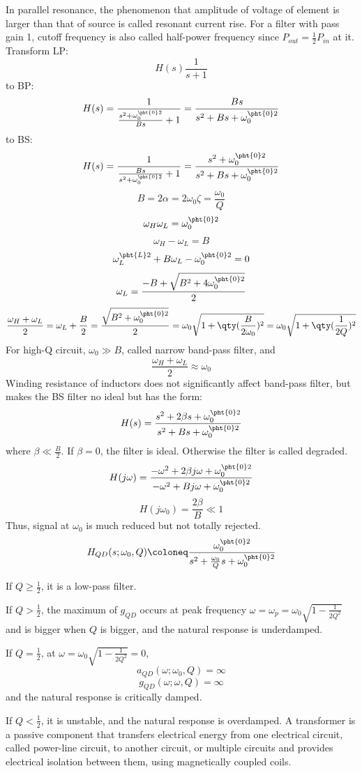 \documentclass[a4paper,12pt]{article}
\begin{document}
In parallel resonance, the phenomenon that amplitude of voltage of element is larger than that of source is called resonant current rise.
For a filter with pass gain 1, cutoff frequency is also called half-power frequency since $P_{out}=\frac{1}{2}P_{in}$ at it.
Transform LP:
\[H(s)\frac{1}{s+1}\]
to BP:
\[H(s)=\frac{1}{\frac{s^2+\omega_0^{\pht{0}2}}{Bs}+1}=\frac{Bs}{s^2+Bs+\omega_0^{\pht{0}2}}\]
to BS:
\[H(s)=\frac{1}{\frac{Bs}{s^2+\omega_0^{\pht{0}2}}+1}=\frac{s^2+\omega_0^{\pht{0}2}}{s^2+Bs+\omega_0^{\pht{0}2}}\]
\[B=2\alpha=2\omega_0\zeta=\frac{\omega_0}{Q}\]
\[\omega_H\omega_L=\omega_0^{\pht{0}2}\]
\[\omega_H-\omega_L=B\]
\[\omega_L^{\pht{L}2}+B\omega_L-\omega_0^{\pht{0}2}=0\]
\[\omega_L=\frac{-B+\sqrt{B^2+4\omega_0^{\pht{0}2}}}{2}\]
\[\frac{\omega_H+\omega_L}{2}=\omega_L+\frac{B}{2}=\frac{\sqrt{B^2+\omega_0^{\pht{0}2}}}{2}=\omega_0\sqrt{1+\qty(\frac{B}{2\omega_0})^2}=\omega_0\sqrt{1+\qty(\frac{1}{2Q})^2}\]
For high-Q circuit, $\omega_0\gg B$, called narrow band-pass filter, and
\[\frac{\omega_H+\omega_L}{2}\approx\omega_0\]
Winding resistance of inductors does not significantly affect band-pass filter, but makes the BS filter no ideal but has the form:
\[H(s)=\frac{s^2+2\beta s+\omega_0^{\pht{0}2}}{s^2+Bs+\omega_0^{\pht{0}2}}\]
where $\beta\ll\frac{B}{2}$. If $\beta=0$, the filter is ideal. Otherwise the filter is called degraded. 
\[H(j\omega)=\frac{-\omega^2+2\beta j\omega+\omega_0^{\pht{0}2}}{-\omega^2+Bj\omega+\omega_0^{\pht{0}2}}\]
\[H(j\omega_0)=\frac{2\beta}{B}\ll1\]
Thus, signal at $\omega_0$ is much reduced but not totally rejected.
\[H_{QD}(s;\omega_0,Q)\coloneq\frac{\omega_0^{\pht{0}2}}{s^2+\frac{\omega_0}{Q}s+\omega_0^{\pht{0}2}}\]
\bit
\item If $Q\ge\frac{1}{2}$, it is a low-pass filter.
\item If $Q>\frac{1}{2}$, the maximum of $g_{QD}$ occurs at peak frequency $\omega=\omega_p=\omega_0\sqrt{1-\frac{1}{2Q^2}}$ and is bigger when $Q$ is bigger, and the natural response is underdamped.
\item If $Q=\frac{1}{2}$, at $\omega=\omega_0\sqrt{1-\frac{1}{2Q^2}}=0$,
\[a_{QD}(\omega;\omega_0,Q)=\infty\]
\[g_{QD}(\omega;\omega,Q)=\infty\]
and the natural response is critically damped.
\item If $Q<\frac{1}{2}$, it is unstable, and the natural response is overdamped.
\eit
{}
A transformer is a passive component that transfers electrical energy from one electrical circuit, called power-line circuit, to another circuit, or multiple circuits and provides electrical isolation between them, using magnetically coupled coils.
\end{document}
